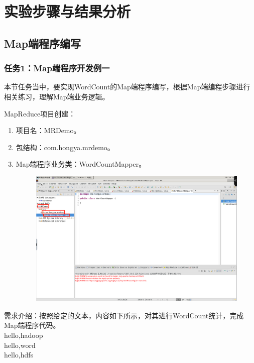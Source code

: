 \documentclass {article}
\begin{document}
	\section{实验步骤与结果分析}
		\subsection{Map端程序编写}
			\subsubsection{任务1：Map端程序开发例一}
				本节任务当中，要实现WordCount的Map端程序编写，根据Map端编程步骤进行相关练习，理解Map端业务逻辑。
	
				MapReduce项目创建：
				\begin{enumerate}
					\item 项目名：MRDemo。
					\item 包结构：com.hongya.mrdemo。
					\item Map端程序业务类：WordCountMapper。
					\begin{figure}[H]
						\centering
						\includegraphics[width=4.5in]{figures/fig1.png}
					\end{figure}
				\end{enumerate}
				
				需求介绍：按照给定的文本，内容如下所示，对其进行WordCount统计，完成Map端程序代码。\\
				hello,hadoop \\
				hello,word \\
				hello,hdfs
				
\end{document}
